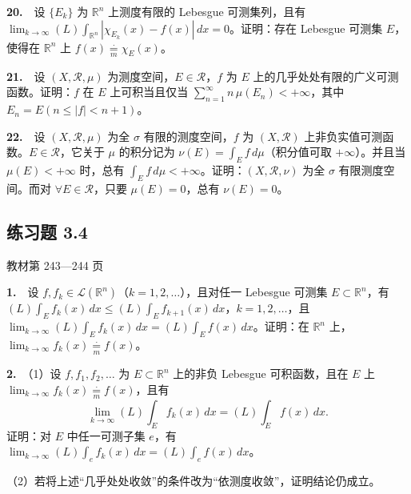 \documentclass[11pt,a4paper]{article}
\begin{document}
\par{}\noindent \textbf{20.}　设 \(\{E_k\}\) 为 \(\mathbb R^n\) 上测度有限的 Lebesgue 可测集列，且有 \(\lim_{k\to\infty}(L)\int_{\mathbb R^n}|\chi_{E_k}(x)-f(x)|\,dx=0\)。证明：存在 Lebesgue 可测集 \(E\)，使得在 \(\mathbb R^n\) 上 \(f(x)\underset{m}{\overset{\cdot}{=}}\chi_E(x)\)。

\par{}\noindent \textbf{21.}　设 \((X,\mathcal R,\mu)\) 为测度空间，\(E\in\mathcal R\)，\(f\) 为 \(E\) 上的几乎处处有限的广义可测函数。证明：\(f\) 在 \(E\) 上可积当且仅当 \(\sum_{n=1}^\infty n\,\mu(E_n)<+\infty\)，其中 \(E_n=E(n\le |f|<n+1)\)。

\par{}\noindent \textbf{22.}　设 \((X,\mathcal R,\mu)\) 为全 \(\sigma\) 有限的测度空间，\(f\) 为 \((X,\mathcal R)\) 上非负实值可测函数。\(E\in\mathcal R\)，它关于 \(\mu\) 的积分记为 \(\nu(E)=\int_E f\,d\mu\)（积分值可取 \(+\infty\)）。并且当 \(\mu(E)<+\infty\) 时，总有 \(\int_E f\,d\mu<+\infty\)。证明：\((X,\mathcal R,\nu)\) 为全 \(\sigma\) 有限测度空间。而对 \(\forall E\in\mathcal R\)，只要 \(\mu(E)=0\)，总有 \(\nu(E)=0\)。


\hypertarget{ex4}{}\subsection*{练习题 3.4}
\noindent 教材第 243—244 页

\par{}\noindent \textbf{1.}　设 \(f,f_k\in\mathcal L(\mathbb R^n)\)（\(k=1,2,\ldots\)），且对任一 Lebesgue 可测集 \(E\subset\mathbb R^n\)，有 \((L)\int_E f_k(x)\,dx\le(L)\int_E f_{k+1}(x)\,dx\)，\(k=1,2,\ldots\)，且 \(\lim_{k\to\infty}(L)\int_E f_k(x)\,dx=(L)\int_E f(x)\,dx\)。证明：在 \(\mathbb R^n\) 上，\(\lim_{k\to\infty}f_k(x)\underset{m}{\overset{\cdot}{=}} f(x)\)。

\par{}\noindent \textbf{2.}　（1）设 \(f,f_1,f_2,\ldots\) 为 \(E\subset\mathbb R^n\) 上的非负 Lebesgue 可积函数，且在 \(E\) 上 \(\lim_{k\to\infty} f_k(x)\underset{m}{\overset{\cdot}{=}} f(x)\)，且有 \[\lim_{k\to\infty}(L)\int_E f_k(x)\,dx=(L)\int_E f(x)\,dx.\]证明：对 \(E\) 中任一可测子集 \(e\)，有 \(\lim_{k\to\infty}(L)\int_e f_k(x)\,dx=(L)\int_e f(x)\,dx\)。

（2）若将上述``几乎处处收敛''的条件改为``依测度收敛''，证明结论仍成立。
\end{document}
